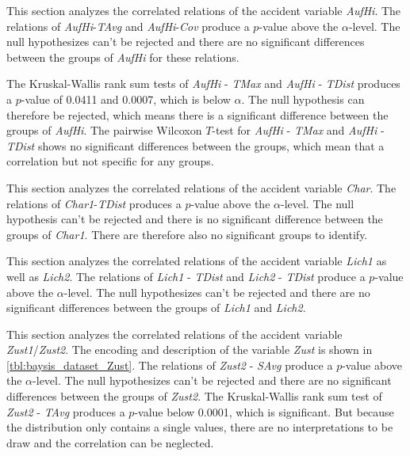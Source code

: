 This section analyzes the correlated relations of the accident variable \textit{AufHi}. The relations of \textit{AufHi}-\textit{TAvg} and \textit{AufHi}-\textit{Cov} produce a $p$-value above the $\alpha$-level. The null hypothesizes can't be rejected and there are no significant differences between the groups of \textit{AufHi} for these relations.

The Kruskal-Wallis rank sum tests of \textit{AufHi} - \textit{TMax} and \textit{AufHi} - \textit{TDist} produces a $p$-value of 0.0411 and 0.0007, which is below $\alpha$. The null hypothesis can therefore be rejected, which means there is a significant difference between the groups of \textit{AufHi}. The pairwise Wilcoxon $T$-test for \textit{AufHi} - \textit{TMax} and \textit{AufHi} - \textit{TDist} shows no significant differences between the groups, which mean that a correlation but not specific for any groups.

This section analyzes the correlated relations of the accident variable \textit{Char}. The relations of \textit{Char1}-\textit{TDist} produces a $p$-value above the $\alpha$-level. The null hypothesis can't be rejected and there is no significant difference between the groups of \textit{Char1}. There are therefore also no significant groups to identify.

This section analyzes the correlated relations of the accident variable \textit{Lich1} as well as \textit{Lich2}. The relations of \textit{Lich1} - \textit{TDist} and \textit{Lich2} - \textit{TDist} produce a $p$-value above the $\alpha$-level. The null hypothesizes can't be rejected and there are no significant differences between the groups of \textit{Lich1} and \textit{Lich2}.

This section analyzes the correlated relations of the accident variable \textit{Zust1}/\textit{Zust2}. The encoding and description of the variable \textit{Zust} is shown in \cref{tbl:baysis_dataset_Zust}. The relations of \textit{Zust2} - \textit{SAvg} produce a $p$-value above the $\alpha$-level. The null hypothesizes can't be rejected and there are no significant differences between the groups of \textit{Zust2}. The Kruskal-Wallis rank sum test of \textit{Zust2} - \textit{TAvg} produces a $p$-value below 0.0001, which is significant. But because the distribution only contains a single values, there are no interpretations to be draw and the correlation can be neglected.

